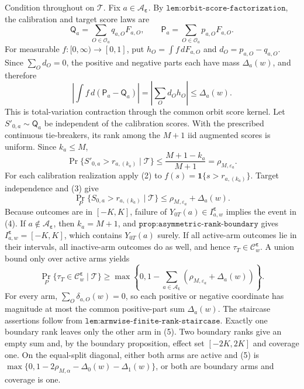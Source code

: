Condition throughout on \(\mathcal T\). Fix \(a\in\mathcal A_{\boldsymbol\varepsilon}\). By \(\texttt{lem:orbit-score-factorization}\), the calibration and target score laws are
\[
\mathsf Q_a=\sum_{O\in\mathcal O_a}q_{a,O}F_{a,O},\qquad \mathsf P_a=\sum_{O\in\mathcal O_a}p_{a,O}F_{a,O}.
\tag{1}
\]
For measurable \(f:[0,\infty)\to[0,1]\), put \(h_O=\int f\,dF_{a,O}\) and \(d_O=p_{a,O}-q_{a,O}\). Since \(\sum_Od_O=0\), the positive and negative parts each have mass \(\Delta_a(w)\), and therefore
\[
\left|\int f\,d(\mathsf P_a-\mathsf Q_a)\right|=\left|\sum_Od_Oh_O\right|\le\Delta_a(w).
\tag{2}
\]
This is total-variation contraction through the common orbit score kernel. Let \(S'_{0,a}\sim\mathsf Q_a\) be independent of the calibration scores. With the prescribed continuous tie-breakers, its rank among the \(M+1\) iid augmented scores is uniform. Since \(k_a\le M\),
\[
\Pr\{S'_{0,a}>r_{a,(k_a)}\mid\mathcal T\}\le\frac{M+1-k_a}{M+1}=\rho_{M,\varepsilon_a}.
\tag{3}
\]
For each calibration realization apply (2) to \(f(s)=\mathbf1\{s>r_{a,(k_a)}\}\). Target independence and (3) give
\[
\Pr_P\{S_{0,a}>r_{a,(k_a)}\mid\mathcal T\}\le\rho_{M,\varepsilon_a}+\Delta_a(w).
\tag{4}
\]
Because outcomes are in \([-K,K]\), failure of \(Y_{0T}(a)\in I^{\boldsymbol\varepsilon}_{a,w}\) implies the event in (4). If \(a\notin\mathcal A_{\boldsymbol\varepsilon}\), then \(k_a=M+1\), and \(\texttt{prop:asymmetric-rank-boundary}\) gives \(I^{\boldsymbol\varepsilon}_{a,w}=[-K,K]\), which contains \(Y_{0T}(a)\) surely. If all active-arm outcomes lie in their intervals, all inactive-arm outcomes do as well, and hence \(\tau_T\in\mathcal C^{\boldsymbol\varepsilon}_w\). A union bound only over active arms yields
\[
\Pr_P\{\tau_T\in\mathcal C^{\boldsymbol\varepsilon}_w\mid\mathcal T\}\ge\max\left\{0,1-\sum_{a\in\mathcal A_{\boldsymbol\varepsilon}}(\rho_{M,\varepsilon_a}+\Delta_a(w))\right\}.
\tag{5}
\]
For every arm, \(\sum_O\delta_{a,O}(w)=0\), so each positive or negative coordinate has magnitude at most the common positive-part sum \(\Delta_a(w)\). The staircase assertions follow from \(\texttt{lem:armwise-finite-rank-staircase}\). Exactly one boundary rank leaves only the other arm in (5). Two boundary ranks give an empty sum and, by the boundary proposition, effect set \([-2K,2K]\) and coverage one. On the equal-split diagonal, either both arms are active and (5) is \(\max\{0,1-2\rho_{M,\alpha}-\Delta_0(w)-\Delta_1(w)\}\), or both are boundary arms and coverage is one.